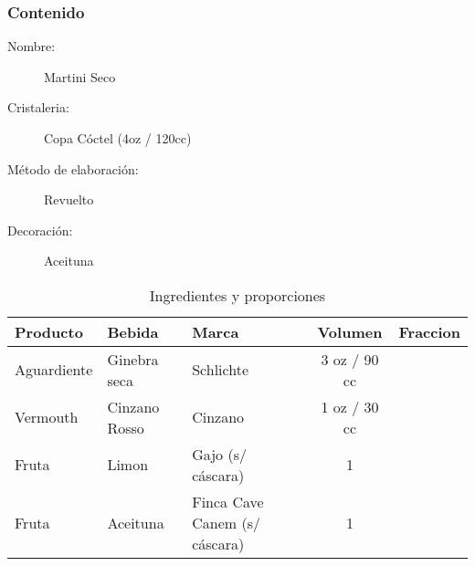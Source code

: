\bigskip 
\bigskip 
\subsubsection{Contenido}
\bigskip 

\begin{description}
\item[Nombre:] Martini Seco
\item[Cristaleria:] Copa Cóctel (4oz / 120cc)
\item[M\'etodo de elaboraci\'on:] Revuelto
\item[Decoraci\'on:] Aceituna
\end{description}

\begin{table}[h]
\caption{Ingredientes y proporciones} 
\label{tab:fonts}
\begin{center}       
\begin{tabular}{|l|l|l|c|l|} %
\hline
\rule[-1ex]{0pt}{3.5ex}  \textbf{Producto} & \textbf{Bebida} & \textbf{Marca} & \textbf{Volumen} & \textbf{Fraccion}  \\
\hline
\rule[-1ex]{0pt}{3.5ex}  Aguardiente & Ginebra seca 			& Schlichte 		& 3 oz / 90 cc 	&  	\\
\hline
\rule[-1ex]{0pt}{3.5ex}  Vermouth 		& Cinzano Rosso 	& Cinzano 				& 1 oz / 30 cc 		&  	\\
\hline
\rule[-1ex]{0pt}{3.5ex}  Fruta 		& Limon & Gajo (s/ c\'ascara)	& 1		& 	\\
\hline
\rule[-1ex]{0pt}{3.5ex}  Fruta 		& Aceituna & Finca Cave Canem (s/ c\'ascara)	& 1		& 	\\
\hline
\end{tabular}
\end{center}
\end{table} 
\bigskip 

